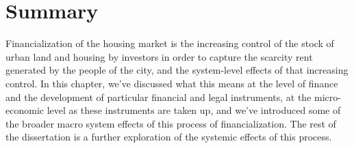 




\section{Summary} 
Financialization of the housing market is the increasing control of the stock of urban land and housing by investors in order to capture the scarcity rent generated by the people of the city, and the system-level effects of that increasing control.  In this chapter, we've discussed what this means at the level of finance and the development of particular financial and legal instruments, at the micro-economic level as these instruments are taken up, and we've introduced some of the broader macro system effects of this process of financialization. The rest of the dissertation is a further exploration of the systemic effects of this process. 





